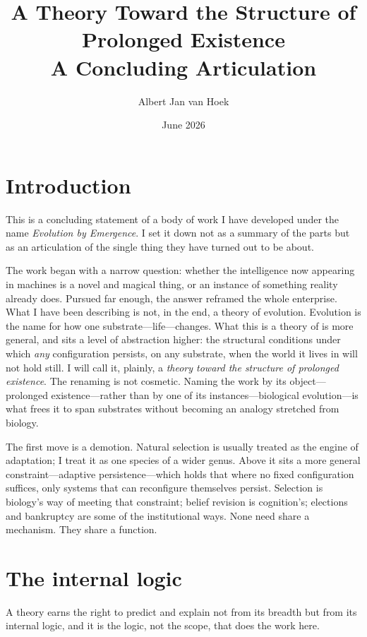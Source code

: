 \documentclass[11pt]{article}
\title{A Theory Toward the Structure of Prolonged Existence\\[0.35em]
\large A Concluding Articulation}
\author{Albert Jan van Hoek}
\date{June 2026}
\begin{document}
\maketitle

\section*{Introduction}

This is a concluding statement of a body of work I have developed under the name \emph{Evolution by Emergence}. I set it down not as a summary of the parts but as an articulation of the single thing they have turned out to be about.

The work began with a narrow question: whether the intelligence now appearing in machines is a novel and magical thing, or an instance of something reality already does. Pursued far enough, the answer reframed the whole enterprise. What I have been describing is not, in the end, a theory of evolution. Evolution is the name for how one substrate---life---changes. What this is a theory of is more general, and sits a level of abstraction higher: the structural conditions under which \emph{any} configuration persists, on any substrate, when the world it lives in will not hold still. I will call it, plainly, a \emph{theory toward the structure of prolonged existence}. The renaming is not cosmetic. Naming the work by its object---prolonged existence---rather than by one of its instances---biological evolution---is what frees it to span substrates without becoming an analogy stretched from biology.

The first move is a demotion. Natural selection is usually treated as the engine of adaptation; I treat it as one species of a wider genus. Above it sits a more general constraint---adaptive persistence---which holds that where no fixed configuration suffices, only systems that can reconfigure themselves persist. Selection is biology's way of meeting that constraint; belief revision is cognition's; elections and bankruptcy are some of the institutional ways. None need share a mechanism. They share a function.

\section*{The internal logic}

A theory earns the right to predict and explain not from its breadth but from its internal logic, and it is the logic, not the scope, that does the work here.
\end{document}
